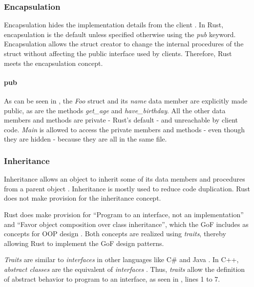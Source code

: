 \subsubsection{Encapsulation}
Encapsulation hides the implementation details from the client \cite{klabnik_2019_01,meyer_97_01,savitch_15_01}.
In Rust, encapsulation is the default unless specified otherwise using the \textit{pub} keyword.
Encapsulation allows the struct creator to change the internal procedures of the struct without affecting the public interface used by clients.
Therefore, Rust meets the encapsulation concept.

\paragraph{pub}
As can be seen in , the \textit{Foo} struct and its \textit{name} data member are explicitly made public, as are the methods \textit{get\_age} and \textit{have\_birthday}.
All the other data members and methods are private - Rust's default - and unreachable by client code.
\textit{Main} is allowed to access the private members and methods - even though they are hidden - because they are all in the same file.

\subsubsection{Inheritance}
Inheritance allows an object to inherit some of its data members and procedures from a parent object \cite{meyer_97_01,stefik_85_01,gamma_94_01,savitch_15_01}.
Inheritance is mostly used to reduce code duplication.
Rust does not make provision for the inheritance concept.

Rust does make provision for ``Program to an interface, not an implementation'' and ``Favor object composition over class inheritance'', which the GoF includes as concepts for OOP design \cite{gamma_94_01}.
Both concepts are realized using \textit{traits}, thereby allowing Rust to implement the GoF design patterns.

\textit{Traits} are similar \cite{klabnik_2019_01} to \textit{interfaces} in other languages like C\# \cite{robinson_04_01} and Java \cite{gosling_96_01}.
In C++, \textit{abstract classes} are the equivalent of \textit{interfaces} \cite{malik_09_01,stroustrup_13_01,alexandrescu_01_01}.
Thus, \textit{traits} allow the definition of abstract behavior to program to an interface, as seen in , lines 1 to 7.

